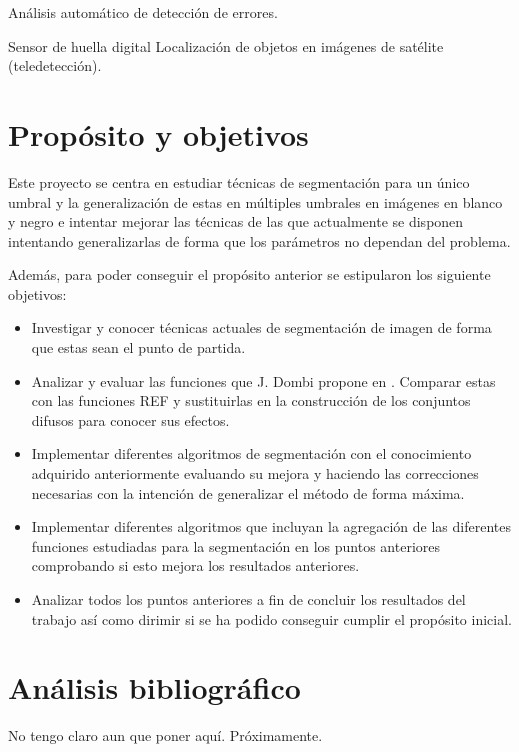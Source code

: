 Análisis automático de detección de errores.

Sensor de huella digital
Localización de objetos en imágenes de satélite (teledetección).


\section{Propósito y objetivos}\label{sec:objetivos}

Este proyecto se centra en estudiar técnicas de segmentación para un único umbral y la generalización de estas en múltiples umbrales en imágenes en blanco y negro e intentar mejorar las técnicas de las que actualmente se disponen intentando generalizarlas de forma que los parámetros no dependan del problema. 

Además, para poder conseguir el propósito anterior se estipularon los siguiente objetivos:
\begin{itemize}
	\item Investigar y conocer técnicas actuales de segmentación de imagen de forma que estas sean el punto de partida.
	\item Analizar y evaluar las funciones que J. Dombi propone en \cite{art:dombi}. Comparar estas con las funciones REF y sustituirlas en la construcción de los conjuntos difusos para conocer sus efectos.
	\item Implementar diferentes algoritmos de segmentación con el conocimiento adquirido anteriormente evaluando su mejora y haciendo las correcciones necesarias con la intención de generalizar el método de forma máxima.
	\item Implementar diferentes algoritmos que incluyan la agregación de las diferentes funciones estudiadas para la segmentación en los puntos anteriores comprobando si esto mejora los resultados anteriores.
	\item Analizar todos los puntos anteriores a fin de concluir los resultados del trabajo así como dirimir si se ha podido conseguir cumplir el propósito inicial.
\end{itemize}

\section{Análisis bibliográfico}
No tengo claro aun que poner aquí. Próximamente.
